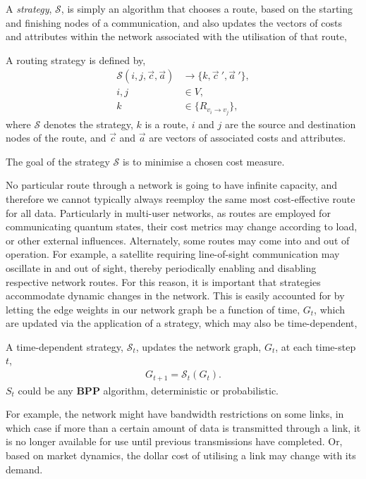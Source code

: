 A \textit{strategy}, $\mathcal{S}$, is simply an algorithm that chooses a route, based on the starting and finishing nodes of a communication, and also updates the vectors of costs and attributes within the network associated with the utilisation of that route,
\begin{definition}
A routing strategy is defined by,
	\begin{align}
\mathcal{S}(i,j,\vec{c},\vec{a}) &\to \{k,{\vec{c}}~',{\vec{a}}~'\}, \nonumber \\
i,j &\in V, \nonumber\\
k &\in \{R_{v_i\to v_j}\},
\end{align}
where $\mathcal{S}$ denotes the strategy, $k$ is a route, $i$ and $j$ are the source and destination nodes of the route, and $\vec{c}$ and $\vec{a}$ are vectors of associated costs and attributes.
\end{definition}
The goal of the strategy $\mathcal{S}$ is to minimise a chosen cost measure.

No particular route through a network is going to have infinite capacity, and therefore we cannot typically always reemploy the same most cost-effective route for all data. Particularly in multi-user networks, as routes are employed for communicating quantum states, their cost metrics may change according to load, or other external influences. Alternately, some routes may come into and out of operation. For example, a satellite requiring line-of-sight communication may oscillate in and out of sight, thereby periodically enabling and disabling respective network routes. For this reason, it is important that strategies accommodate dynamic changes in the network. This is easily accounted for by letting the edge weights in our network graph be a function of time, $G_t$, which are updated via the application of a strategy, which may also be time-dependent,
\begin{definition}
A time-dependent strategy, $\mathcal{S}_t$, updates the network graph, $G_t$, at each time-step $t$,
\begin{align} \label{eq:S_G}
G_{t+1} = \mathcal{S}_t(G_t).
\end{align}
$S_t$ could be any \textbf{BPP} algorithm, deterministic or probabilistic.
\end{definition}
For example, the network might have bandwidth restrictions on some links, in which case if more than a certain amount of data is transmitted through a link, it is no longer available for use until previous transmissions have completed. Or, based on market dynamics, the dollar cost of utilising a link may change with its demand.

